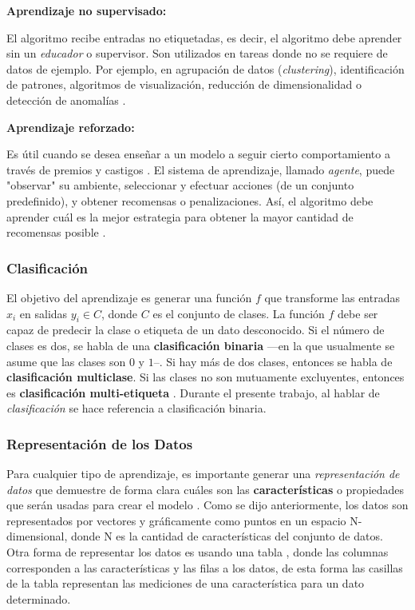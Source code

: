 \textbf{Aprendizaje no supervisado:} 
%

El algoritmo recibe entradas no etiquetadas, es decir, el algoritmo debe aprender sin un \textit{educador} o supervisor. Son utilizados en tareas donde no se requiere de datos de ejemplo. Por ejemplo, en agrupación de datos (\emph{clustering}), identificación de patrones, algoritmos de visualización, reducción de dimensionalidad o detección de anomalías \cite{Bishop}.  
%

\textbf{Aprendizaje reforzado:} 
%

Es útil cuando se desea enseñar a un modelo a seguir cierto comportamiento a través de premios y castigos \cite{Bishop}. El sistema de aprendizaje, llamado \emph{agente}, puede "observar" su ambiente, seleccionar y efectuar acciones (de un conjunto predefinido), y obtener recomensas o penalizaciones. Así, el algoritmo debe aprender cuál es la mejor estrategia para obtener la mayor cantidad de recomensas posible \cite{Geron}. 

\subsubsection{Clasificación}
El objetivo del aprendizaje es generar una función $f$ que transforme las entradas $x_i$ en salidas $y_i \in C$, donde $C$ es el conjunto de clases. La función $f$ debe ser capaz de predecir la clase o etiqueta de un dato desconocido. Si el número de clases es dos, se habla de una \textbf{clasificación binaria} ---en la que usualmente se asume que las clases son $0$ y $1$--. Si hay más de dos clases, entonces se habla de \textbf{clasificación multiclase}. Si las clases no son mutuamente excluyentes, entonces es \textbf{clasificación multi-etiqueta} \cite{Murphy}.
%
Durante el presente trabajo, al hablar de \textit{clasificación} se hace referencia a clasificación binaria.
%

\subsubsection{Representación de los Datos}
Para cualquier tipo de aprendizaje, es importante generar una \textit{representación de datos} que demuestre de forma clara cuáles son las \textbf{características} o propiedades que serán usadas para crear el modelo \cite{Muller}. Como se dijo anteriormente, los datos son representados por vectores y gráficamente como puntos en un espacio N-dimensional, donde N es la cantidad de características del conjunto de datos. Otra forma de representar los datos es usando una tabla \cite{Fernandes}, donde las columnas corresponden a las características y las filas a los datos, de esta forma las casillas de la tabla representan las mediciones de una característica para un dato determinado.
%

